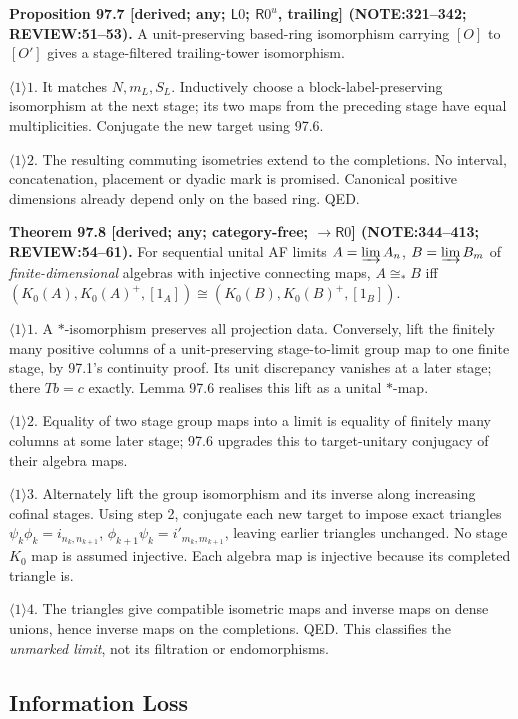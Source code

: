 \textbf{Proposition 97.7 [derived; any; \(\mathsf L0\); \(\mathsf R0^u\), trailing] (NOTE:321--342; REVIEW:51--53).}
A unit-preserving based-ring isomorphism carrying \([O]\) to \([O']\) gives a stage-filtered trailing-tower isomorphism.
\par\(\langle1\rangle1\). It matches \(N,m_L,S_L\). Inductively choose a block-label-preserving isomorphism at the next
stage; its two maps from the preceding stage have equal multiplicities. Conjugate the new target using 97.6.
\par\(\langle1\rangle2\). The resulting commuting isometries extend to the completions. No interval, concatenation,
placement or dyadic mark is promised. Canonical positive dimensions already depend only on the based ring. QED.

\textbf{Theorem 97.8 [derived; any; category-free; \(\to\mathsf R0\)] (NOTE:344--413; REVIEW:54--61).}
For sequential unital AF limits \(A=\varinjlim A_n\), \(B=\varinjlim B_m\) of \emph{finite-dimensional} algebras with
injective connecting maps, \(A\cong_*B\) iff \((K_0(A),K_0(A)^+,[1_A])\cong(K_0(B),K_0(B)^+,[1_B])\).
\par\(\langle1\rangle1\). A \(*\)-isomorphism preserves all projection data. Conversely, lift the finitely many positive
columns of a unit-preserving stage-to-limit group map to one finite stage, by 97.1's continuity proof. Its unit
discrepancy vanishes at a later stage; there \(Tb=c\) exactly. Lemma 97.6 realises this lift as a unital \(*\)-map.
\par\(\langle1\rangle2\). Equality of two stage group maps into a limit is equality of finitely many columns at
some later stage; 97.6 upgrades this to target-unitary conjugacy of their algebra maps.
\par\(\langle1\rangle3\). Alternately lift the group isomorphism and its inverse along increasing cofinal stages.
Using step 2, conjugate each new target to impose exact triangles
\(\psi_k\phi_k=i_{n_k,n_{k+1}}\), \(\phi_{k+1}\psi_k=i'_{m_k,m_{k+1}}\), leaving earlier triangles unchanged.
No stage \(K_0\) map is assumed injective. Each algebra map is injective because its completed triangle is.
\par\(\langle1\rangle4\). The triangles give compatible isometric maps and inverse maps on dense unions, hence
inverse maps on the completions. QED. This classifies the \emph{unmarked limit}, not its filtration or endomorphisms.

\subsection{Information Loss}

